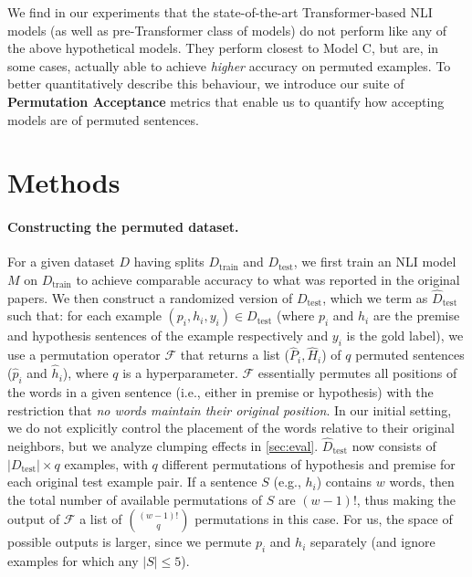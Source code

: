 \documentclass[11pt,a4paper]{article}
\newcommand{\PermAcc}{Permutation Acceptance} %
\begin{document}
We find in our experiments that the state-of-the-art Transformer-based NLI models (as well as pre-Transformer class of models) do not perform like any of the above hypothetical models. They perform closest to Model C, but are, in some cases, actually able to achieve \emph{higher} accuracy on permuted examples. To better quantitatively describe this behaviour,
we introduce our suite of \textbf{\PermAcc} metrics that enable us to quantify how accepting models are of permuted sentences. 

\section{Methods}\label{sec:constructpermut}


\paragraph{Constructing the permuted dataset.} For a given dataset $D$ having splits $D_{\text{train}}$ and $D_{\text{test}}$, we first train an NLI model $M$ on $D_{\text{train}}$ to achieve comparable accuracy to what was reported in the original papers. We then construct a randomized version of $D_{\text{test}}$, which we term as $\hat{D}_{\text{test}}$ such that: for each example $(p_i,h_i,y_i) \in D_{\text{test}}$ (where $p_i$ and $h_i$ are the premise and hypothesis sentences of the example respectively and $y_i$ is the gold label), we use a permutation operator $\mathcal{F}$ that returns a list ($\hat{P}_i, \hat{H}_i$) of $q$ permuted sentences ($\hat{p}_i$ and $\hat{h}_i$), where $q$ is a hyperparameter. $\mathcal{F}$ essentially permutes all positions of the words in a given sentence (i.e., either in premise or hypothesis) with the restriction that \textit{no words maintain their original position}.  In our initial setting, we do not explicitly control the placement of the words relative to their original neighbors, but we analyze clumping effects in \autoref{sec:eval}.
$\hat{D}_{\text{test}}$ now consists of $|D_{\text{test}}| \times q$ examples, with $q$ different permutations of hypothesis and premise for each original test example pair. If a sentence $S$ (e.g., $h_i$) contains $w$ words, then the total number of available permutations of $S$ are $(w-1)!$, thus making the output of $\mathcal{F}$ a list of $(w-1)! \choose q$ permutations in this case. For us, the space of possible outputs is larger, since we permute $p_i$ and $h_i$ separately (and ignore examples for which any $|S|\leq5$).
\end{document}
